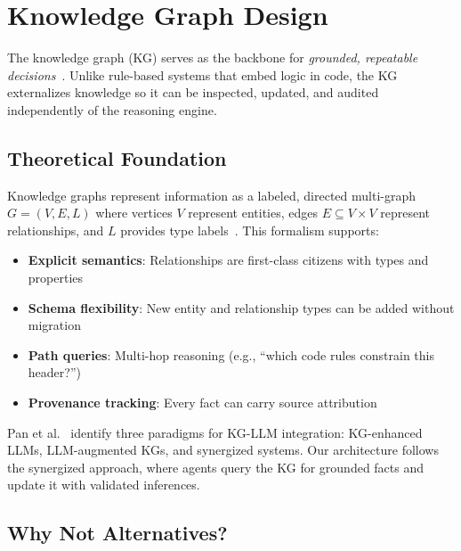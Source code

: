 
\section{Knowledge Graph Design}
\label{sec:kg}

The knowledge graph (KG) serves as the backbone for \emph{grounded, repeatable decisions}~\cite{hogan2021kg_survey, zheng2022kg_construction}.
Unlike rule-based systems that embed logic in code, the KG externalizes knowledge so it can be inspected, updated, and audited independently of the reasoning engine.

\subsection{Theoretical Foundation}

Knowledge graphs represent information as a labeled, directed multi-graph $G = (V, E, L)$ where vertices $V$ represent entities, edges $E \subseteq V \times V$ represent relationships, and $L$ provides type labels~\cite{hogan2021kg_survey}.
This formalism supports:

\begin{itemize}
  \item \textbf{Explicit semantics}: Relationships are first-class citizens with types and properties
  \item \textbf{Schema flexibility}: New entity and relationship types can be added without migration
  \item \textbf{Path queries}: Multi-hop reasoning (e.g., ``which code rules constrain this header?'')
  \item \textbf{Provenance tracking}: Every fact can carry source attribution
\end{itemize}

Pan et al.~\cite{pan2024unifying_kg_llm} identify three paradigms for KG-LLM integration: KG-enhanced LLMs, LLM-augmented KGs, and synergized systems.
Our architecture follows the synergized approach, where agents query the KG for grounded facts and update it with validated inferences.

\subsection{Why Not Alternatives?}

